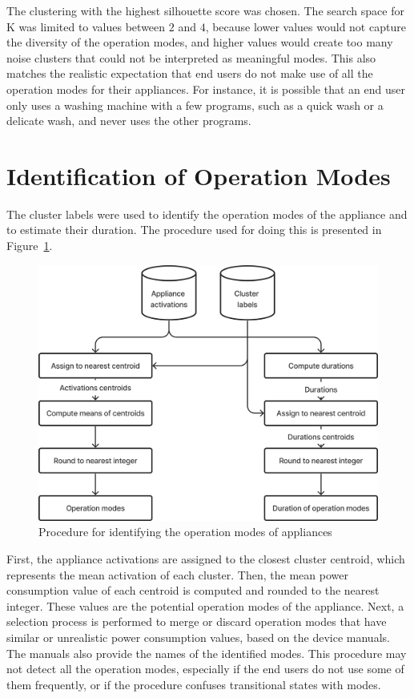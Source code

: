 The clustering with the highest silhouette score was chosen. The search space for K was limited to values between $2$ and $4$, because lower values would not capture the diversity of the operation modes, and higher values would create too many noise clusters that could not be interpreted as meaningful modes. This also matches the realistic expectation that end users do not make use of all the operation modes for their appliances. For instance, it is possible that an end user only uses a washing machine with a few programs, such as a quick wash or a delicate wash, and never uses the other programs.

\section{Identification of Operation Modes}

The cluster labels were used to identify the operation modes of the appliance and to estimate their duration. The procedure used for doing this is presented in Figure~\ref{fig:identification}.

\begin{figure}
  \centering
  \includegraphics[width=.55\linewidth]{images/modes_clustering/identification.png}
  \caption{Procedure for identifying the operation modes of appliances}
  \label{fig:identification}
\end{figure}

First, the appliance activations are assigned to the closest cluster centroid, which represents the mean activation of each cluster. Then, the mean power consumption value of each centroid is computed and rounded to the nearest integer. These values are the potential operation modes of the appliance. Next, a selection process is performed to merge or discard operation modes that have similar or unrealistic power consumption values, based on the device manuals. The manuals also provide the names of the identified modes. This procedure may not detect all the operation modes, especially if the end users do not use some of them frequently, or if the procedure confuses transitional states with modes.

